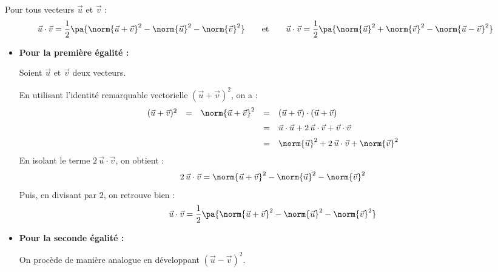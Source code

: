 \begin{prop}
	Pour tous vecteurs $\vec{u}$ et $\vec{v}$ :
	\[
		\vec{u}\cdot\vec{v} = \dfrac{1}{2}\pa{\norm{\vec{u} + \vec{v}}^2 - \norm{\vec{u}}^2 - \norm{\vec{v}}^2}
		\qquad\text{et}\qquad
		\vec{u}\cdot\vec{v} = \dfrac{1}{2}\pa{\norm{\vec{u}}^2 + \norm{\vec{v}}^2 - \norm{\vec{u} - \vec{v}}^2}
	\]

\end{prop}
\begin{demo}
	\nline
	\begin{itemize}
		\item \textbf{Pour la première égalité :}

		      Soient $\vec{u}$ et $\vec{v}$ deux vecteurs.

		      En utilisant l'identité remarquable vectorielle $(\vec{u} + \vec{v})^2$, on a :
		      \[
			      \begin{array}{rcccl}
				      (\vec{u} + \vec{v})^2 & = & \norm{\vec{u} + \vec{v}}^2 & = & (\vec{u} + \vec{v}) \cdot (\vec{u} + \vec{v})                          \\[2mm]
				                            &   &                            & = & \vec{u} \cdot \vec{u} + 2\,\vec{u}\cdot\vec{v} + \vec{v} \cdot \vec{v} \\[2mm]
				                            &   &                            & = & \norm{\vec{u}}^2 + 2\,\vec{u}\cdot\vec{v} + \norm{\vec{v}}^2
			      \end{array}
		      \]
		      En isolant le terme $2\,\vec{u}\cdot\vec{v}$, on obtient :
		      \[
			      2\,\vec{u}\cdot\vec{v} = \norm{\vec{u} + \vec{v}}^2 - \norm{\vec{u}}^2 - \norm{\vec{v}}^2
		      \]
		      Puis, en divisant par $2$, on retrouve bien :
		      \[
			      \vec{u}\cdot\vec{v} = \dfrac{1}{2}\pa{\norm{\vec{u} + \vec{v}}^2 - \norm{\vec{u}}^2 - \norm{\vec{v}}^2}
		      \]

		\item \textbf{Pour la seconde égalité :}

		      On procède de manière analogue en développant $(\vec{u} - \vec{v})^2$.
	\end{itemize}
\end{demo}

